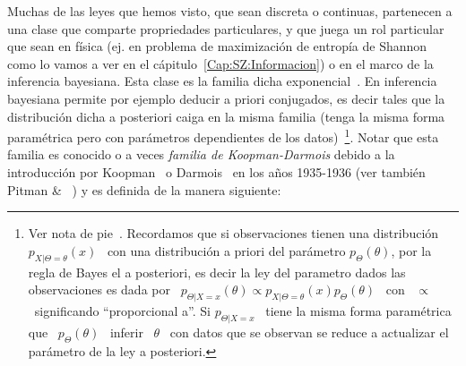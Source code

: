 \label{Ssec:MP:FamiliaExponencial}




Muchas de las leyes que hemos visto, que sean discreta o continuas, partenecen a
una clase que comparte propriedades  particulares, y que juega un rol particular
que sean en f\'isica (ej. en problema de maximizaci\'on de entrop\'ia de Shannon
como lo vamos a ver en  el c\'apitulo~\ref{Cap:SZ:Informacion}) o en el marco de
la inferencia bayesiana. Esta clase es la familia dicha exponencial~\cite{Dar35,
  Koo36, And70, LehCas98, IbPer12,  Muk00, KotBal00, Rob07, Bos07, Cen82, Kay93,
  NieNoc10}.   En inferencia  bayesiana  permite por  ejemplo  deducir a  priori
conjugados, es decir tales que la  distribuci\'on dicha a posteriori caiga en la
misma  familia (\ie  tenga la  misma forma  param\'etrica pero  con par\'ametros
dependientes        de       los       datos)~\footnote{Ver        nota       de
  pie~. Recordamos  que si observaciones  tienen una
  distribuci\'on \  $p_{X|\Theta=\theta}(x)$ \  con una distribuci\'on  a priori
  del par\'ametro $p_\Theta(\theta)$, por la  regla de Bayes el a posteriori, es
  decir  la   ley  del  parametro  dados   las  observaciones  es   dada  por  \
  $p_{\Theta|X=x}(\theta) \propto p_{X|\Theta=\theta}(x) p_\Theta(\theta)$ \ con
  \ $\propto$ \ significando ``proporcional  a''. Si $p_{\Theta|X=x}$ \ tiene la
  misma forma param\'etrica que \  $p_\Theta(\theta)$ \ inferir \ $\theta$ \ con
  datos  que se  observan se  reduce a  actualizar el  par\'ametro de  la  ley a
  posteriori.}. Notar  que esta familia  es conocido o  a veces {\em  familia de
  Koopman-Darmois}  debido  a   la  introducci\'on  por  Koopman~\cite{Koo36}  o
Darmois~\cite{Dar35}  en   los  a\~nos   1935-1936  (ver  tambi\'en   Pitman  \&
~\cite{Pit36}) y es definida de la manera siguiente:
%
